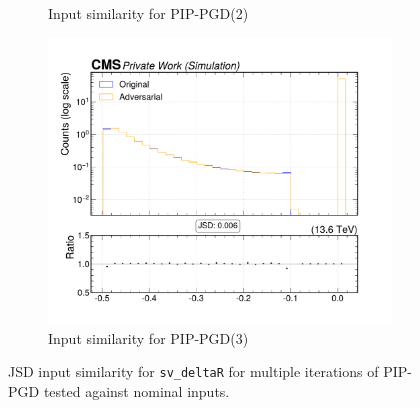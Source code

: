 \begin{figure}[htbp]
\begin{subfigure}[t]{0.32\textwidth}
    \caption*{Input similarity for PIP-PGD(2)}
  \end{subfigure}\hfill
  \begin{subfigure}[t]{0.32\textwidth}
    \includegraphics[width=\linewidth]{media/output/features/compare/combined_it_3/cmp_vtx_arr_sv_deltaR.pdf}
    \caption*{Input similarity for PIP-PGD(3)}
  \end{subfigure}

  \caption*{JSD input similarity for \texttt{sv\_deltaR} for multiple iterations of PIP-PGD tested against nominal inputs.}
  \label{fig:combined_input_sv_deltaR}
\end{figure}

